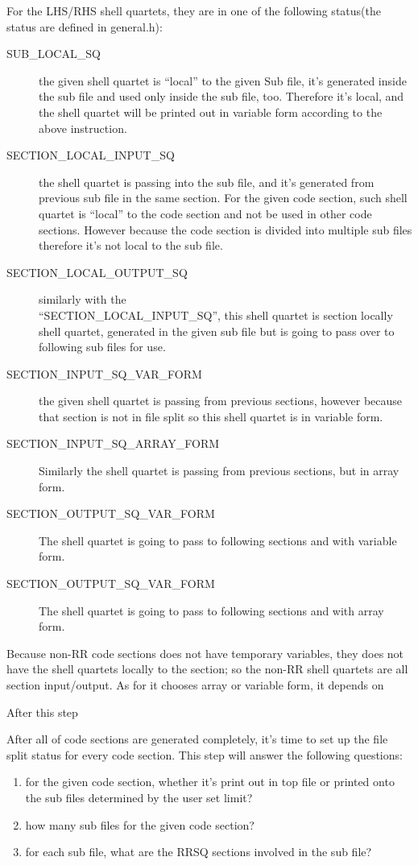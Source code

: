 For the LHS/RHS shell quartets, they are in one of the following status(the status are
defined in general.h):
\begin{description}
 \item [SUB\_LOCAL\_SQ] the given shell quartet is ``local'' to the given Sub
 file, it's generated inside the sub file and used only inside the sub file, too.
 Therefore it's local, and the shell quartet will be printed out in variable 
 form according to the above instruction.
 \item [SECTION\_LOCAL\_INPUT\_SQ] the shell quartet is passing into the sub file, and 
 it's generated from previous sub file in the same section. For the 
 given code section, such shell quartet is ``local'' to the code section and not be 
 used in other code sections. However because the code section is divided into multiple 
 sub files therefore it's not local to the sub file.
 \item [SECTION\_LOCAL\_OUTPUT\_SQ] similarly with the \\
 ``SECTION\_LOCAL\_INPUT\_SQ'', this 
 shell quartet is section locally shell quartet, generated in the given sub file 
 but is going to pass over to following sub files for use.
 \item [SECTION\_INPUT\_SQ\_VAR\_FORM] the given shell quartet is passing from previous 
 sections, however because that section is not in file split so this shell quartet is 
 in variable form.
 \item [SECTION\_INPUT\_SQ\_ARRAY\_FORM] Similarly the shell quartet is passing from
 previous sections, but in array form.
 \item [SECTION\_OUTPUT\_SQ\_VAR\_FORM] The shell quartet is going to pass to following
 sections and with variable form.
 \item [SECTION\_OUTPUT\_SQ\_VAR\_FORM] The shell quartet is going to pass to following
 sections and with array form.
 \end{description}
 
 Because non-RR code sections does not have temporary variables, they does not have 
 the shell quartets locally to the section; so the non-RR shell quartets are all section
 input/output. As for it chooses array or variable form, it depends on 


After this step 

After all of code sections are generated completely, it's time to set up the 
file split status for every code section. This step will answer the following 
questions:
\begin{enumerate}
  \item for the given code section, whether it's print out in top file or printed 
 onto the sub files determined by the user set limit?
 \item how many sub files for the given code section? 
 \item for each sub file, what are the RRSQ sections involved in the sub file?
\end{enumerate}



